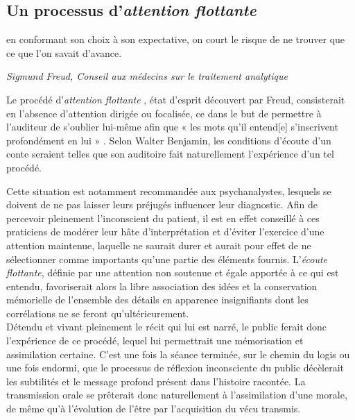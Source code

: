 \clearpage


\subsection{Un processus d'\textit{attention flottante}}

\begin{shadequote}
[...] en conformant son choix à son expectative, on court le risque de ne trouver que ce que l'on savait d'avance.
\par\emph{Sigmund Freud, Conseil aux médecins sur le traitement analytique}
\end{shadequote}

Le procédé d'\textit{attention flottante} \cite{freud1912conseils}, état d'esprit découvert par Freud, consisterait en l'absence d'attention dirigée ou focalisée, ce dans le but de permettre à l'auditeur de s'oublier lui-même afin que « les mots qu'il entend[e] s'inscrivent profondément en lui » \cite{benjamin1991gesammelte}. Selon Walter Benjamin, les conditions d'écoute d'un conte seraient telles que son auditoire fait naturellement l'expérience d'un tel procédé.

Cette situation est notamment recommandée aux psychanalystes, lesquels se doivent de ne pas laisser leurs préjugés influencer leur diagnostic. Afin de percevoir pleinement l'inconscient du patient, il est en effet conseillé à ces praticiens de modérer leur hâte d'interprétation et d'éviter l'exercice d'une attention maintenue, laquelle ne saurait durer et aurait pour effet de ne sélectionner comme importants qu'une partie des éléments fournis. L'\textit{écoute flottante}, définie par une attention non soutenue et égale apportée à ce qui est entendu, favoriserait alors la libre association des idées et la conservation mémorielle de l'ensemble des détails en apparence insignifiants dont les corrélations ne se feront qu'ultérieurement.\\

Détendu et vivant pleinement le récit qui lui est narré, le public ferait donc l'expérience de ce procédé, lequel lui permettrait une mémorisation et assimilation certaine. C'est une fois la séance terminée, sur le chemin du logis ou une fois endormi, que le processus de réflexion inconsciente du public décèlerait les subtilités et le message profond présent dans l'histoire racontée. La transmission orale se prêterait donc naturellement à l'assimilation d'une morale, de même qu'à l'évolution de l'être par l'acquisition du vécu transmis.


